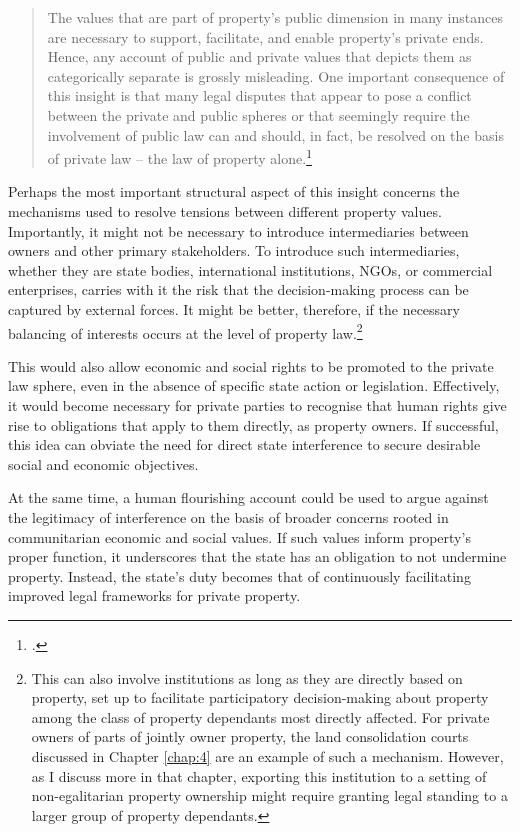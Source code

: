 \begin{quote} The values that are
part of property's public dimension in many instances are necessary
to support, facilitate, and enable property's private ends.
Hence, any account of public and private values that depicts them as categorically
separate is grossly misleading. One important consequence of this
insight is that many legal disputes that appear to pose a conflict between
the private and public spheres or that seemingly
require the involvement of public law can and
should, in fact, be resolved on the basis of private law -- the law
of property alone.\footcite[1295-1296]{alexander14} \end{quote}

Perhaps the most important structural aspect of this insight concerns the mechanisms used to resolve tensions between different property values. Importantly, it might not be necessary to introduce intermediaries between owners and other primary stakeholders. To introduce such intermediaries, whether they are state bodies, international institutions, NGOs, or commercial enterprises, carries with it the risk that the decision-making process can be captured by external forces. It might be better, therefore, if the necessary balancing of interests occurs at the level of property law.\footnote{This can also involve institutions as long as they are directly based on property, set up to facilitate participatory decision-making about property among the class of property dependants most directly affected. For private owners of parts of jointly owner property, the land consolidation courts discussed in Chapter \ref{chap:4} are an example of such a mechanism. However, as I discuss more in that chapter, exporting this institution to a setting of non-egalitarian property ownership might require granting legal standing to a larger group of property dependants.}

This would also allow economic and social rights to be promoted to the private law sphere, even in the absence of specific state action or legislation. Effectively, it would become necessary for private parties to recognise that human rights give rise to obligations that apply to them directly, as property owners. If successful, this idea can obviate the need for direct state interference to secure desirable social and economic objectives. 

At the same time, a human flourishing account could be used to argue against the legitimacy of interference on the basis of broader concerns rooted in communitarian economic and social values. If such values inform property's proper function, it underscores that the state has an obligation to not undermine property. Instead, the state's duty becomes that of continuously facilitating improved legal frameworks for private property.

